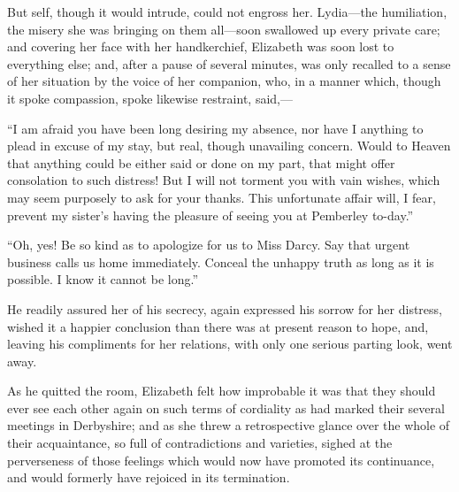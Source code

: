 \documentclass[12pt,openright]{book}
\begin{document}
But self, though it would intrude, could not engross her. Lydia—the humiliation, the misery she was bringing on them all—soon swallowed up every private care; and covering her face with her handkerchief, Elizabeth was soon lost to everything else; and, after a pause of several minutes, was only recalled to a sense of her situation by the voice of her companion, who, in a manner which, though it spoke compassion, spoke likewise restraint, said,—

“I am afraid you have been long desiring my absence, nor have I anything to plead in excuse of my stay, but real, though unavailing concern. Would to Heaven that anything could be either said or done on my part, that might offer consolation to such distress! But I will not torment you with vain wishes, which may seem purposely to ask for your thanks. This unfortunate affair will, I fear, prevent my sister’s having the pleasure of seeing you at Pemberley to-day.”

“Oh, yes! Be so kind as to apologize for us to Miss Darcy. Say that urgent business calls us home immediately. Conceal the unhappy truth as long as it is possible. I know it cannot be long.”

He readily assured her of his secrecy, again expressed his sorrow for her distress, wished it a happier conclusion than there was at present reason to hope, and, leaving his compliments for her relations, with only one serious parting look, went away.

As he quitted the room, Elizabeth felt how improbable it was that they should ever see each other again on such terms of cordiality as had marked their several meetings in Derbyshire; and as she threw a retrospective glance over the whole of their acquaintance, so full of contradictions and varieties, sighed at the perverseness of those feelings which would now have promoted its continuance, and would formerly have rejoiced in its termination.
\end{document}

